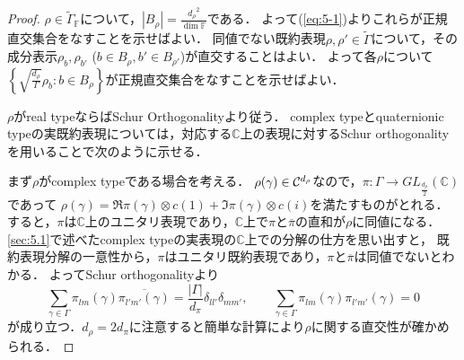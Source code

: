 \documentclass[11pt]{article}
\theoremstyle{definition}
\begin{document}
\begin{proof}
    $\rho \in \tilde{\Gamma}_\mathbb{F}$について，$|B_\rho|=\frac{{d_\rho}^2}{\dim \mathbb{F}}$である．
    よって(\ref{eq:5-1})よりこれらが正規直交集合をなすことを示せばよい．
    同値でない既約表現$\rho, \rho' \in \tilde{\Gamma}$について，その成分表示$\rho_b, \rho_{b'}$ ($b \in B_\rho, b' \in B_{\rho'}$)が直交することはよい．
    よって各$\rho$について$\left\{\sqrt{\frac{d_\rho}{\Gamma}} \rho_b:b\in B_\rho \right\}$が正規直交集合をなすことを示せばよい．
    
    $\rho$がreal typeならばSchur Orthogonalityより従う．
    complex typeとquaternionic typeの実既約表現については，対応する$\mathbb{C}$上の表現に対するSchur orthogonalityを用いることで次のように示せる．

    まず$\rho$がcomplex typeである場合を考える．
    $\rho(\gamma) \in {\cal C}^{d_\rho}$なので，$\pi:\Gamma \rightarrow GL_{\frac{d_\rho}{2}}(\mathbb{C})$であって
    $\rho(\gamma)=\Re \pi(\gamma) \otimes c(1) + \Im \pi(\gamma) \otimes c(i)$を満たすものがとれる．
    すると，$\pi$は$\mathbb{C}$上のユニタリ表現であり，$\mathbb{C}$上で$\pi$と$\overline{\pi}$の直和が$\rho$に同値になる．
    \ref{sec:5.1}で述べたcomplex typeの実表現の$\mathbb{C}$上での分解の仕方を思い出すと，
    既約表現分解の一意性から，$\pi$はユニタリ既約表現であり，$\pi$と$\overline{\pi}$は同値でないとわかる．
    よってSchur orthogonalityより
    \[
        \sum_{\gamma \in \Gamma} \pi_{lm}(\gamma)\overline{\pi_{l'm'}(\gamma)} = \frac{|\Gamma|}{d_\pi}\delta_{ll'}\delta_{mm'},
        \qquad \sum_{\gamma \in \Gamma} \pi_{lm}(\gamma) \pi_{l'm'}(\gamma) = 0
    \]
    が成り立つ．$d_\rho=2d_\pi$に注意すると簡単な計算により$\rho$に関する直交性が確かめられる．


\end{proof}
\end{document}
